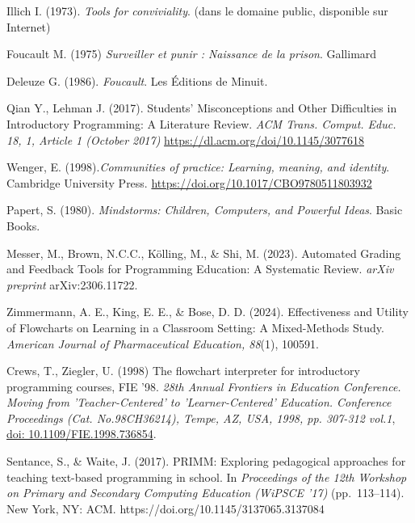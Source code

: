 \documentclass[11pt,a4paper]{article}
\begin{document}
\clearpage
\begin{thebibliography}{99}

 Illich I. (1973). \textit{Tools for conviviality}. (dans le domaine public, disponible sur Internet)

 Foucault M. (1975)  \textit{Surveiller et punir : Naissance de la prison}.  Gallimard

 Deleuze G. (1986). \textit{Foucault}. Les Éditions de Minuit.

Qian Y., Lehman J. (2017). Students’ Misconceptions and Other Difficulties in Introductory Programming: A Literature Review. \textit{ACM Trans. Comput. Educ. 18, 1, Article 1 (October 2017)} \url{https://dl.acm.org/doi/10.1145/3077618}

Wenger, E. (1998).\textit{Communities of practice: Learning, meaning, and identity}. Cambridge University Press. \url{https://doi.org/10.1017/CBO9780511803932}

 Papert, S. (1980). \textit{Mindstorms: Children, Computers, and Powerful Ideas}. Basic Books.

Messer, M., Brown, N.C.C., Kölling, M., \& Shi, M. (2023). Automated Grading 
and Feedback Tools for Programming Education: A Systematic Review. \textit{arXiv preprint} 
arXiv:2306.11722.

 Zimmermann, A. E., King, E. E., \& Bose, D. D. (2024). Effectiveness 
and Utility of Flowcharts on Learning in a Classroom Setting: A Mixed-Methods Study. 
\textit{American Journal of Pharmaceutical Education, 88}(1), 100591.


Crews, T., Ziegler, U. (1998) The flowchart interpreter for introductory programming courses, FIE '98. \textit{28th Annual Frontiers in Education Conference. Moving from 'Teacher-Centered' to 'Learner-Centered' Education. Conference Proceedings (Cat. No.98CH36214), Tempe, AZ, USA, 1998, pp. 307-312 vol.1}, \url{doi: 10.1109/FIE.1998.736854}.


Sentance, S., \& Waite, J. (2017).
PRIMM: Exploring pedagogical approaches for teaching text-based programming in school.
In \textit{Proceedings of the 12th Workshop on Primary and Secondary Computing Education (WiPSCE '17)} (pp.~113--114).
New York, NY: ACM.
https://doi.org/10.1145/3137065.3137084


\end{thebibliography}
\end{document}
